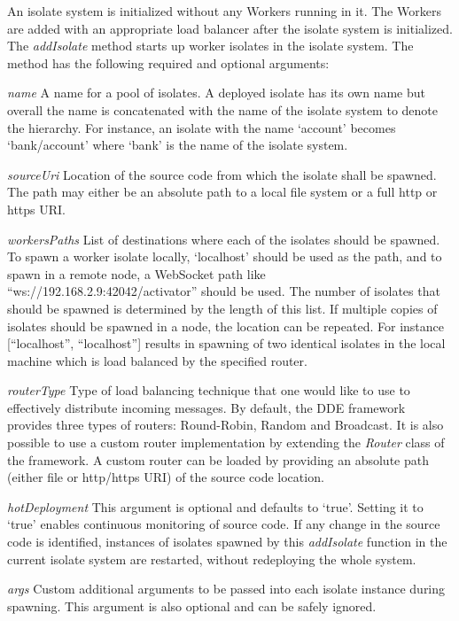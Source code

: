   An isolate system is initialized without any Workers running in it. The Workers are added with an appropriate load balancer after the isolate system is initialized. The \emph{addIsolate} method starts up worker isolates in the isolate system. The method has the following required and optional arguments:
  \begin{description}
    \item{\itshape{name}} \textendash{} A name for a pool of isolates. A deployed isolate has its own name but overall the name is concatenated with the name of the isolate system to denote the hierarchy. For instance, an isolate with the name ‘account’ becomes ‘bank/account’ where ‘bank’ is the name of the isolate system.
    \item{\itshape{sourceUri}} \textendash{} Location of the source code from which the isolate shall be spawned. The path may either be an absolute path to a local file system or a full http or https URI.
    \item{\itshape{workersPaths}} \textendash{} List of destinations where each of the isolates should be spawned. To spawn a worker isolate locally, ‘localhost’ should be used as the path, and to spawn in a remote node, a WebSocket path like “ws://192.168.2.9:42042/activator” should be used. The number of isolates that should be spawned is determined by the length of this list. If multiple copies of isolates should be spawned in a node, the location can be repeated. For instance [“localhost”, “localhost”] results in spawning of two identical isolates in the local machine which is load balanced by the specified router.
    \item{\itshape{routerType}} \textendash{} Type of load balancing technique that one would like to use to effectively distribute incoming messages. By default, the DDE framework provides three types of routers: Round-Robin, Random and Broadcast. It is also possible to use a custom router implementation by extending the \emph{Router} class of the framework. A custom router can be loaded by providing an absolute path (either file or http/https URI) of the source code location.
    \item{\itshape{hotDeployment}} \textendash{} This argument is optional and defaults to ‘true’. Setting it to ‘true’ enables continuous monitoring of source code. If any change in the source code is identified, instances of isolates spawned by this \emph{addIsolate} function in the current isolate system are restarted, without redeploying the whole system.
    \item{\itshape{args}} \textendash{} Custom additional arguments to be passed into each isolate instance during spawning. This argument is also optional and can be safely ignored.
  \end{description}

